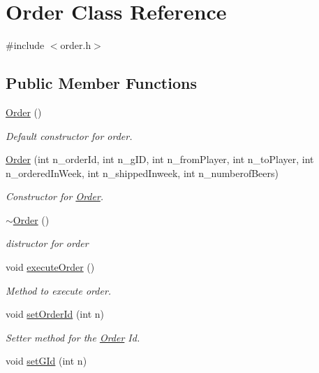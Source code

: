 \hypertarget{class_order}{}\section{Order Class Reference}
\label{class_order}


{\ttfamily \#include $<$order.\+h$>$}

\subsection*{Public Member Functions}
\begin{DoxyCompactItemize}
\item 
\hyperlink{class_order_a7b6a660b03708ed5b4e1c4a6dc2a664a}{Order} ()
\begin{DoxyCompactList}\small\item\em Default constructor for order. \end{DoxyCompactList}\item 
\hyperlink{class_order_a0c5d4bfa1c8d671665ddd0ecd1cf45d9}{Order} (int n\+\_\+order\+Id, int n\+\_\+g\+ID, int n\+\_\+from\+Player, int n\+\_\+to\+Player, int n\+\_\+ordered\+In\+Week, int n\+\_\+shipped\+Inweek, int n\+\_\+numberof\+Beers)
\begin{DoxyCompactList}\small\item\em Constructor for \hyperlink{class_order}{Order}. \end{DoxyCompactList}\item 
\hyperlink{class_order_a8fb25876ccbd534465f5f96ef9bb2212}{$\sim$\+Order} ()
\begin{DoxyCompactList}\small\item\em distructor for order \end{DoxyCompactList}\item 
void \hyperlink{class_order_a065c7828b1608d906dc9f2f2cc43ee35}{execute\+Order} ()
\begin{DoxyCompactList}\small\item\em Method to execute order. \end{DoxyCompactList}\item 
void \hyperlink{class_order_abb0a14e231e3b3e0d3e59405e3dd9884}{set\+Order\+Id} (int n)
\begin{DoxyCompactList}\small\item\em Setter method for the \hyperlink{class_order}{Order} Id. \end{DoxyCompactList}\item 
void \hyperlink{class_order_a15811f6d8f69a15cc5ca2558328310d6}{set\+G\+Id} (int n)

\end{DoxyCompactItemize}
